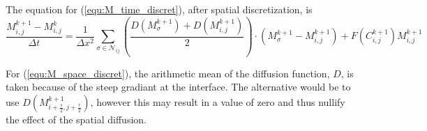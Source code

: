 The equation for (\ref{equ:M_time_discret}), after spatial discretization, is
\begin{equation} \label{equ:M_space_discret}
  \frac{M^{k+1}_{i,j} - M^{k}_{i,j}}{\Delta t} =
    \frac{1}{\Delta x^2} \sum_{\sigma \in \mathcal{N}_{ij}}
    \left( \frac{D(M^{k+1}_{\sigma}) + D(M^{k+1}_{i,j})}{2} \right)
    \cdot \left( M^{k+1}_{\sigma} - M^{k+1}_{i,j} \right)
    + F(C^{k+1}_{i,j}) M^{k+1}_{i,j}
\end{equation}

For (\ref{equ:M_space_discret}), the arithmetic mean of the diffusion function, $D$, is taken because of the steep gradiant at the interface.
The alternative would be to use $D(M^{k+1}_{i+\frac{s}{2}, j +\frac{r}{2}})$, however this may result in a value of zero and thus nullify the effect of the spatial diffusion.


